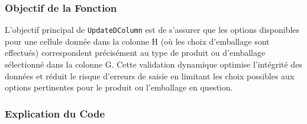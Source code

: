 \documentclass[a4paper, oneside, 12pt, final]{extreport}
\begin{document}
\subsubsection{Objectif de la Fonction}
L'objectif principal de \texttt{UpdateDColumn} est de s'assurer que les options disponibles pour une cellule donnée dans la colonne H (où les choix d'emballage sont effectués) correspondent précisément au type de produit ou d'emballage sélectionné dans la colonne G. Cette validation dynamique optimise l'intégrité des données et réduit le risque d'erreurs de saisie en limitant les choix possibles aux options pertinentes pour le produit ou l'emballage en question.

\subsubsection{Explication du Code}
\end{document}
